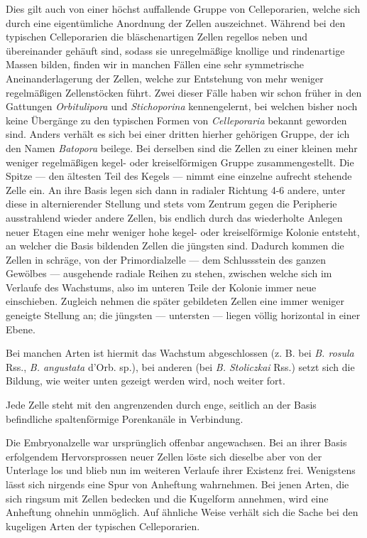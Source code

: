 \documentclass[a4paper, 11pt, oneside, german]{article}
\begin{document}
Dies gilt auch von einer höchst auffallende Gruppe von Celleporarien, welche sich durch eine eigentümliche Anordnung der Zellen auszeichnet. Während bei den typischen Celleporarien die bläschenartigen Zellen regellos neben und übereinander gehäuft sind, sodass sie unregelmäßige knollige und rindenartige Massen bilden, finden wir in manchen Fällen eine sehr symmetrische Aneinanderlagerung der Zellen, welche zur Entstehung von mehr weniger regelmäßigen Zellenstöcken führt. Zwei dieser Fälle haben wir schon früher in den Gattungen \emph{Orbitulipora} und \emph{Stichoporina} kennengelernt, bei welchen bisher noch keine Übergänge zu den typischen Formen von \emph{Celleporaria} bekannt geworden sind. Anders verhält es sich bei einer dritten hierher gehörigen Gruppe, der ich den Namen \emph{Batopora} beilege. Bei derselben sind die Zellen zu einer kleinen mehr weniger regelmäßigen kegel- oder kreiselförmigen Gruppe zusammengestellt. Die Spitze --- den ältesten Teil des Kegels --- nimmt eine einzelne aufrecht stehende Zelle ein. An ihre Basis legen sich dann in radialer Richtung 4-6 andere, unter diese in alternierender Stellung und stets vom Zentrum gegen die Peripherie ausstrahlend wieder andere Zellen, bis endlich durch das wiederholte Anlegen neuer Etagen eine mehr weniger hohe kegel- oder kreiselförmige Kolonie entsteht, an welcher die Basis bildenden Zellen die jüngsten sind. Dadurch kommen die Zellen in schräge, von der Primordialzelle --- dem Schlussstein des ganzen Gewölbes --- ausgehende radiale Reihen zu stehen, zwischen welche sich im Verlaufe des Wachstums, also im unteren Teile der Kolonie immer neue einschieben. Zugleich nehmen die später gebildeten Zellen eine immer weniger geneigte Stellung an; die jüngsten --- untersten --- liegen völlig horizontal in einer Ebene.

Bei manchen Arten ist hiermit das Wachstum abgeschlossen (z. B. bei \emph{B. rosula} Rss., \emph{B. angustata} d'Orb. sp.), bei anderen (bei \emph{B. Stoliczkai} Rss.) setzt sich die Bildung, wie weiter unten gezeigt werden wird, noch weiter fort.

Jede Zelle steht mit den angrenzenden durch enge, seitlich an der Basis befindliche spaltenförmige Porenkanäle in Verbindung.

Die Embryonalzelle war ursprünglich offenbar angewachsen. Bei an ihrer Basis erfolgendem Hervorsprossen neuer Zellen löste sich dieselbe aber von der Unterlage los und blieb nun im weiteren Verlaufe ihrer Existenz frei. Wenigstens lässt sich nirgends eine Spur von Anheftung wahrnehmen. Bei jenen Arten, die sich ringsum mit Zellen bedecken und die Kugelform annehmen, wird eine Anheftung ohnehin unmöglich. Auf ähnliche Weise verhält sich die Sache bei den kugeligen Arten der typischen Celleporarien.
\end{document}
